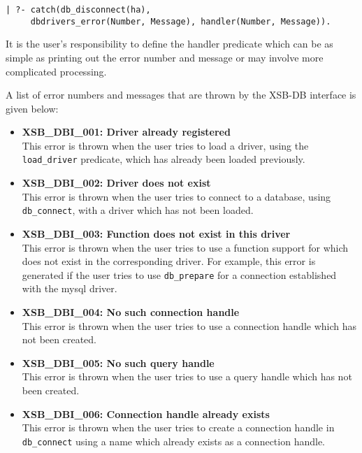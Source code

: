 \begin{verbatim}
| ?- catch(db_disconnect(ha),
     dbdrivers_error(Number, Message), handler(Number, Message)).
\end{verbatim}

It is the user's responsibility to define the handler predicate which can be as simple
as printing out the error number and message or may involve more 
complicated  processing.

A list of error numbers and messages that are thrown by the XSB-DB interface
is given below:

\begin{itemize}

\item {\bf XSB\_DBI\_001: Driver already registered}\\
This error is thrown when the user tries to load a driver, using the {\tt load\_driver} 
predicate, which has already been loaded previously.

\item {\bf XSB\_DBI\_002: Driver does not exist}\\
This error is thrown when the user tries to connect to a database, using
{\tt db\_connect}, with a driver which has not been loaded.

\item {\bf XSB\_DBI\_003: Function does not exist in this driver}\\
This error is thrown when the user tries to use a function support 
for which does not exist in the corresponding driver. For example, 
this error is generated if the user
tries to use {\tt db\_prepare} for a connection established with the
mysql driver.

\item {\bf XSB\_DBI\_004: No such connection handle}\\
This error is thrown when the user tries to use a connection handle
which has not been created.

\item {\bf XSB\_DBI\_005: No such query handle}\\
This error is thrown when the user tries to use a query handle which has 
not been created.

\item {\bf XSB\_DBI\_006: Connection handle already exists}\\
This error is thrown when the user tries to create a connection handle in
{\tt db\_connect} using a name which already exists as a connection handle.


\end{itemize}
